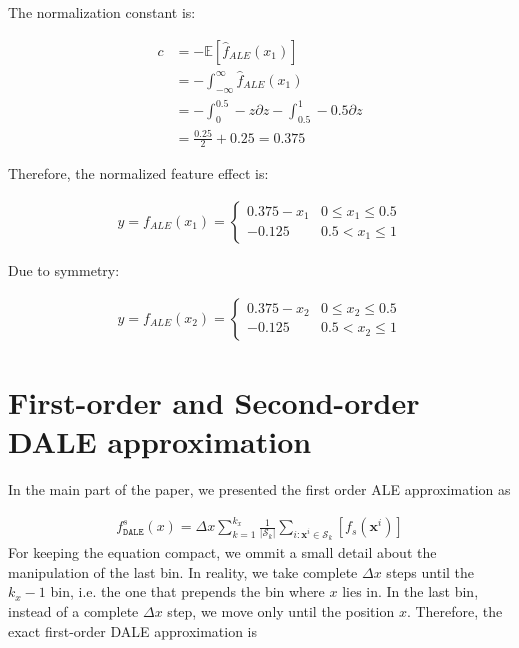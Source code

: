 \documentclass[wcp]{jmlr}
\newcommand{\xb}{\mathbf{x}}
\begin{document}
The normalization constant is:

\begin{equation}
  \label{eq:constant}
  \begin{split}
    c & = - \mathbb{E}[\hat{f}_{ALE}(x_1)] \\
    & = - \int_{-\infty}^{\infty} \hat{f}_{ALE}(x_1) \\
    & = - \int_{0}^{0.5} - z \partial z - \int_{0.5}^{1} -0.5 \partial z \\
    & = \frac{0.25}{2} + 0.25 = 0.375
  \end{split}
\end{equation}

Therefore, the normalized feature effect is:

\begin{gather}
y = f_{ALE}(x_1) =
\begin{cases}
0.375 - x_1 & 0 \leq x_1 \leq 0.5\\
- 0.125 &  0.5 < x_1 \leq 1
\end{cases}
\end{gather}

Due to symmetry:

\begin{gather}
y = f_{ALE}(x_2) =
\begin{cases}
0.375 - x_2 & 0 \leq x_2 \leq 0.5\\
- 0.125 &  0.5 < x_2 \leq 1
\end{cases}
\end{gather}

\section{First-order and Second-order DALE approximation}

In the main part of the paper, we presented the first order ALE approximation as

\begin{align}
  f_{\mathtt{DALE}}^s(x) = \Delta x \sum_{k=1}^{k_x} \frac{1}{|\mathcal{S}_k|}
  \sum_{i:\xb^i \in \mathcal{S}_k} [f_s(\xb^i)]
\end{align}
%
For keeping the equation compact, we ommit a small detail about the
manipulation of the last bin. In reality, we take complete
\( \Delta x \) steps until the \( k_x - 1 \) bin, i.e. the one that
prepends the bin where \( x \) lies in. In the last bin, instead of a
complete \( \Delta x \) step, we move only until the position \( x
\). Therefore, the exact first-order DALE approximation is
\end{document}
